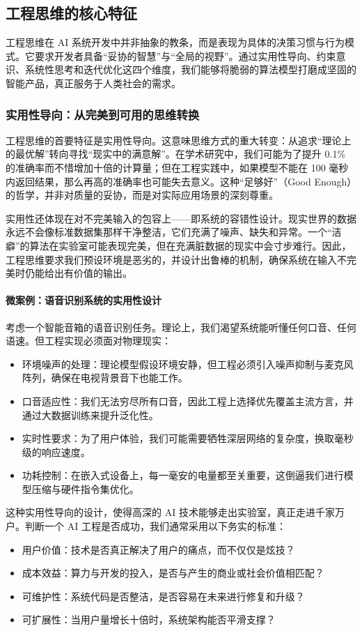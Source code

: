 \subsection{工程思维的核心特征}

工程思维在 AI 系统开发中并非抽象的教条，而是表现为具体的决策习惯与行为模式。它要求开发者具备“妥协的智慧”与“全局的视野”。通过实用性导向、约束意识、系统性思考和迭代优化这四个维度，我们能够将脆弱的算法模型打磨成坚固的智能产品，真正服务于人类社会的需求。

\subsubsection{实用性导向：从完美到可用的思维转换}

工程思维的首要特征是实用性导向。这意味思维方式的重大转变：从追求“理论上的最优解”转向寻找“现实中的满意解”。在学术研究中，我们可能为了提升 0.1\% 的准确率而不惜增加十倍的计算量；但在工程实践中，如果模型不能在 100 毫秒内返回结果，那么再高的准确率也可能失去意义。这种“足够好”（Good Enough）的哲学，并非对质量的妥协，而是对实际应用场景的深刻尊重。

实用性还体现在对不完美输入的包容上——即系统的容错性设计。现实世界的数据永远不会像标准数据集那样干净整洁，它们充满了噪声、缺失和异常。一个“洁癖”的算法在实验室可能表现完美，但在充满脏数据的现实中会寸步难行。因此，工程思维要求我们预设环境是恶劣的，并设计出鲁棒的机制，确保系统在输入不完美时仍能给出有价值的输出。

\paragraph{微案例：语音识别系统的实用性设计}

考虑一个智能音箱的语音识别任务。理论上，我们渴望系统能听懂任何口音、任何语速。但工程实现必须面对物理现实： 
\begin{itemize} 
  \item 环境噪声的处理：理论模型假设环境安静，但工程必须引入噪声抑制与麦克风阵列，确保在电视背景音下也能工作。 
  \item 口音适应性：我们无法穷尽所有口音，因此工程上选择优先覆盖主流方言，并通过大数据训练来提升泛化性。 
  \item 实时性要求：为了用户体验，我们可能需要牺牲深层网络的复杂度，换取毫秒级的响应速度。 
  \item 功耗控制：在嵌入式设备上，每一毫安的电量都至关重要，这倒逼我们进行模型压缩与硬件指令集优化。 
\end{itemize}

这种实用性导向的设计，使得高深的 AI 技术能够走出实验室，真正走进千家万户。判断一个 AI 工程是否成功，我们通常采用以下务实的标准： 
\begin{itemize} 
  \item 用户价值：技术是否真正解决了用户的痛点，而不仅仅是炫技？ 
  \item 成本效益：算力与开发的投入，是否与产生的商业或社会价值相匹配？ 
  \item 可维护性：系统代码是否整洁，是否容易在未来进行修复和升级？ 
  \item 可扩展性：当用户量增长十倍时，系统架构能否平滑支撑？ 
\end{itemize}

